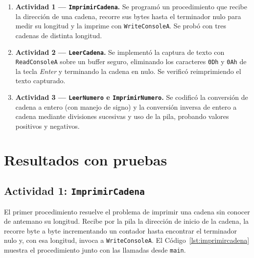\documentclass[a4paper,12pt]{article}
\begin{document}
\begin{enumerate}[label=\textbf{\arabic*.}]
    \item \textbf{Actividad 1 --- \texttt{ImprimirCadena}.} Se programó un procedimiento que recibe la dirección de una cadena, recorre sus bytes hasta el terminador nulo para medir su longitud y la imprime con \texttt{WriteConsoleA}. Se probó con tres cadenas de distinta longitud.

    \item \textbf{Actividad 2 --- \texttt{LeerCadena}.} Se implementó la captura de texto con \texttt{ReadConsoleA} sobre un buffer seguro, eliminando los caracteres \texttt{0Dh} y \texttt{0Ah} de la tecla \textit{Enter} y terminando la cadena en nulo. Se verificó reimprimiendo el texto capturado.

    \item \textbf{Actividad 3 --- \texttt{LeerNumero} e \texttt{ImprimirNumero}.} Se codificó la conversión de cadena a entero (con manejo de signo) y la conversión inversa de entero a cadena mediante divisiones sucesivas y uso de la pila, probando valores positivos y negativos.
\end{enumerate}

\section{Resultados con pruebas}
\subsection{Actividad 1: \texttt{ImprimirCadena}}
El primer procedimiento resuelve el problema de imprimir una cadena sin conocer de antemano su longitud. Recibe por la pila la dirección de inicio de la cadena, la recorre byte a byte incrementando un contador hasta encontrar el terminador nulo y, con esa longitud, invoca a \texttt{WriteConsoleA}. El Código~\ref{lst:imprimircadena} muestra el procedimiento junto con las llamadas desde \texttt{main}.
\end{document}

